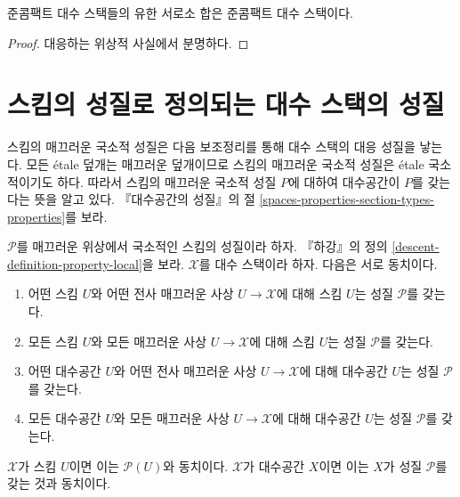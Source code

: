 \begin{lemma}
\label{lemma-finite-disjoint-quasi-compact}
준콤팩트 대수 스택들의 유한 서로소 합은 준콤팩트 대수 스택이다.
\end{lemma}

\begin{proof}
대응하는 위상적 사실에서 분명하다.
\end{proof}


\section{스킴의 성질로 정의되는 대수 스택의 성질}
\label{section-types-properties}

\noindent
스킴의 매끄러운 국소적 성질은 다음 보조정리를 통해 대수 스택의
대응 성질을 낳는다. 모든 \'etale 덮개는 매끄러운 덮개이므로
스킴의 매끄러운 국소적 성질은 \'etale 국소적이기도 하다.
따라서 스킴의 매끄러운 국소적 성질 $P$에 대하여 대수공간이
$P$를 갖는다는 뜻을 알고 있다. 『대수공간의 성질』의 절
\ref{spaces-properties-section-types-properties}를 보라.

\begin{lemma}
\label{lemma-type-property}
$\mathcal{P}$를 매끄러운 위상에서 국소적인 스킴의 성질이라 하자.
『하강』의 정의 \ref{descent-definition-property-local}을 보라.
$\mathcal{X}$를 대수 스택이라 하자. 다음은 서로 동치이다.
\begin{enumerate}
\item 어떤 스킴 $U$와 어떤 전사 매끄러운 사상
$U \to \mathcal{X}$에 대해 스킴 $U$는 성질 $\mathcal{P}$를 갖는다.
\item 모든 스킴 $U$와 모든 매끄러운 사상 $U \to \mathcal{X}$에 대해
스킴 $U$는 성질 $\mathcal{P}$를 갖는다.
\item 어떤 대수공간 $U$와 어떤 전사 매끄러운 사상
$U \to \mathcal{X}$에 대해 대수공간 $U$는 성질 $\mathcal{P}$를 갖는다.
\item 모든 대수공간 $U$와 모든 매끄러운 사상
$U \to \mathcal{X}$에 대해 대수공간 $U$는 성질 $\mathcal{P}$를 갖는다.
\end{enumerate}
$\mathcal{X}$가 스킴 $U$이면 이는 $\mathcal{P}(U)$와 동치이다.
$\mathcal{X}$가 대수공간 $X$이면 이는 $X$가 성질
$\mathcal{P}$를 갖는 것과 동치이다.
\end{lemma}

